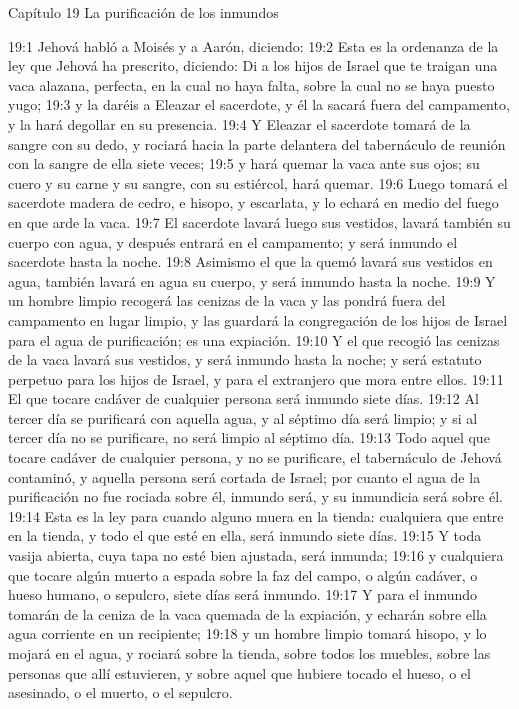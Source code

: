 Capítulo 19
La purificación de los inmundos  

19:1 Jehová habló a Moisés y a Aarón, diciendo:  
19:2 Esta es la ordenanza de la ley que Jehová ha prescrito, diciendo: Di a los hijos de Israel que te traigan una vaca alazana, perfecta, en la cual no haya falta, sobre la cual no se haya puesto yugo;  
19:3 y la daréis a Eleazar el sacerdote, y él la sacará fuera del campamento, y la hará degollar en su presencia.  
19:4 Y Eleazar el sacerdote tomará de la sangre con su dedo, y rociará hacia la parte delantera del tabernáculo de reunión con la sangre de ella siete veces;  
19:5 y hará quemar la vaca ante sus ojos; su cuero y su carne y su sangre, con su estiércol, hará quemar.  
19:6 Luego tomará el sacerdote madera de cedro, e hisopo, y escarlata, y lo echará en medio del fuego en que arde la vaca.  
19:7 El sacerdote lavará luego sus vestidos, lavará también su cuerpo con agua, y después entrará en el campamento; y será inmundo el sacerdote hasta la noche.  
19:8 Asimismo el que la quemó lavará sus vestidos en agua, también lavará en agua su cuerpo, y será inmundo hasta la noche.  
19:9 Y un hombre limpio recogerá las cenizas de la vaca y las pondrá fuera del campamento en lugar limpio, y las guardará la congregación de los hijos de Israel para el agua de purificación; es una expiación.  
19:10 Y el que recogió las cenizas de la vaca lavará sus vestidos, y será inmundo hasta la noche; y será estatuto perpetuo para los hijos de Israel, y para el extranjero que mora entre ellos.  
19:11 El que tocare cadáver de cualquier persona será inmundo siete días.  
19:12 Al tercer día se purificará con aquella agua, y al séptimo día será limpio; y si al tercer día no se purificare, no será limpio al séptimo día.  
19:13 Todo aquel que tocare cadáver de cualquier persona, y no se purificare, el tabernáculo de Jehová contaminó, y aquella persona será cortada de Israel; por cuanto el agua de la purificación no fue rociada sobre él, inmundo será, y su inmundicia será sobre él.  
19:14 Esta es la ley para cuando alguno muera en la tienda: cualquiera que entre en la tienda, y todo el que esté en ella, será inmundo siete días.  
19:15 Y toda vasija abierta, cuya tapa no esté bien ajustada, será inmunda;  
19:16 y cualquiera que tocare algún muerto a espada sobre la faz del campo, o algún cadáver, o hueso humano, o sepulcro, siete días será inmundo.  
19:17 Y para el inmundo tomarán de la ceniza de la vaca quemada de la expiación, y echarán sobre ella agua corriente en un recipiente;  
19:18 y un hombre limpio tomará hisopo, y lo mojará en el agua, y rociará sobre la tienda, sobre todos los muebles, sobre las personas que allí estuvieren, y sobre aquel que hubiere tocado el hueso, o el asesinado, o el muerto, o el sepulcro.  
